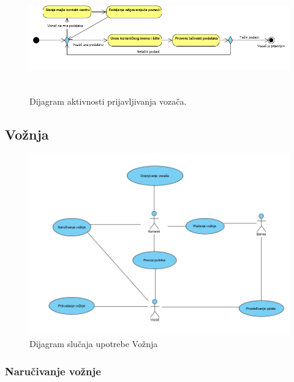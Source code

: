 \begin{figure}[H]
\begin{center}
\includegraphics[width=480pt,height=135pt]{Slike/PrijavljivanjeVozaca.png}
\end{center}
    \caption{Dijagram aktivnosti prijavljivanja vozača.}
\label{fig:PrijavljivanjeVozaca}
\end{figure}

\subsection{\bfseries Vožnja}
\begin{figure}[H]
\begin{center}
\includegraphics[scale=0.7]{Slike/VoznjaUseCase.png}
\end{center}
    \caption{Dijagram slučaja upotrebe Vožnja}
\label{fig:Vožnja}
\end{figure}


\subsubsection{\bfseries Naručivanje vožnje}

